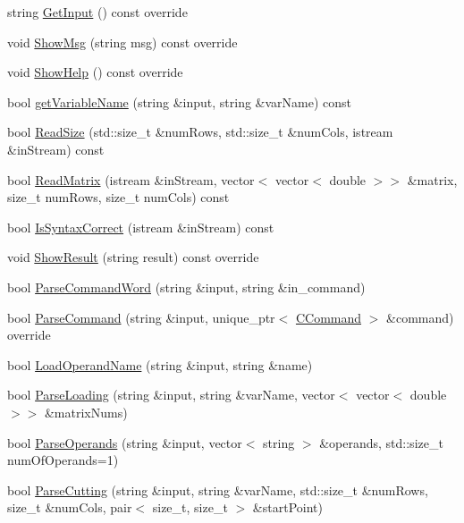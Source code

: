 \begin{DoxyCompactItemize}
\item 
string \hyperlink{classCApplicationConsole_a0af959fae7259bf81f7855985e16adff}{Get\+Input} () const override
\item 
void \hyperlink{classCApplicationConsole_a32152dd2a1793b20fd03ba3179d8e22e}{Show\+Msg} (string msg) const override
\item 
void \hyperlink{classCApplicationConsole_ad9d3e1cdadd2cc2e89dfa3591942f5f3}{Show\+Help} () const override
\item 
bool \hyperlink{classCApplicationConsole_a95f0c288b2224cc1273cf20472cbc34f}{get\+Variable\+Name} (string \&input, string \&var\+Name) const 
\item 
bool \hyperlink{classCApplicationConsole_a1444353413fae5d03ba68a803f724379}{Read\+Size} (std\+::size\+\_\+t \&num\+Rows, std\+::size\+\_\+t \&num\+Cols, istream \&in\+Stream) const 
\item 
bool \hyperlink{classCApplicationConsole_a2323e596b3a019fe843f88955218baba}{Read\+Matrix} (istream \&in\+Stream, vector$<$ vector$<$ double $>$$>$ \&matrix, size\+\_\+t num\+Rows, size\+\_\+t num\+Cols) const 
\item 
bool \hyperlink{classCApplicationConsole_a6ca78c0250dfbdf71a995277c0485e5a}{Is\+Syntax\+Correct} (istream \&in\+Stream) const 
\item 
void \hyperlink{classCApplicationConsole_a4bca66a2f575557ca929d2fa8c8f9028}{Show\+Result} (string result) const override
\item 
bool \hyperlink{classCApplicationConsole_a4ae836d72b1ecdc4b3c3e15ff5f171b6}{Parse\+Command\+Word} (string \&input, string \&in\+\_\+command)
\item 
bool \hyperlink{classCApplicationConsole_ab17d9e0bf16052fff75f721f9aaaafc8}{Parse\+Command} (string \&input, unique\+\_\+ptr$<$ \hyperlink{classCCommand}{C\+Command} $>$ \&command) override
\item 
bool \hyperlink{classCApplicationConsole_a12531e44827274807a3a0787e66345fe}{Load\+Operand\+Name} (string \&input, string \&name)
\item 
bool \hyperlink{classCApplicationConsole_a092af2533775a460a05e7c5198d991fa}{Parse\+Loading} (string \&input, string \&var\+Name, vector$<$ vector$<$ double $>$$>$ \&matrix\+Nums)
\item 
bool \hyperlink{classCApplicationConsole_a00a40d89b87f545373a7ce3d22a7c996}{Parse\+Operands} (string \&input, vector$<$ string $>$ \&operands, std\+::size\+\_\+t num\+Of\+Operands=1)
\item 
bool \hyperlink{classCApplicationConsole_ae3c29fe61ba160f51ead41382df8c494}{Parse\+Cutting} (string \&input, string \&var\+Name, std\+::size\+\_\+t \&num\+Rows, size\+\_\+t \&num\+Cols, pair$<$ size\+\_\+t, size\+\_\+t $>$ \&start\+Point)
\end{DoxyCompactItemize}

